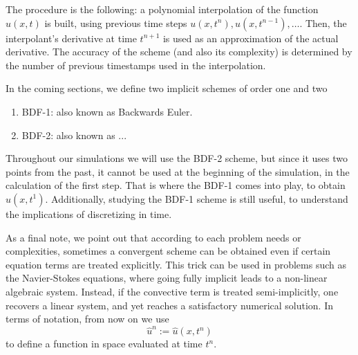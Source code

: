 \documentclass[../../main.tex]{subfiles}
\begin{document}
The procedure is the following: a polynomial interpolation of the function $u(x,t)$ is built, 
using previous time steps $u(x,t^{n}), u(x,t^{n-1}), \ldots$.
Then, the interpolant's derivative at time $t^{n+1}$ is used as an approximation of the actual derivative.
The accuracy of the scheme (and also its complexity) is determined by the number of previous timestamps used in the interpolation. 

In the coming sections, we define two implicit schemes of order one and two
\begin{enumerate}
    \item BDF-1: also known as Backwards Euler.
    \item BDF-2: also known as ... 
\end{enumerate}
Throughout our simulations we will use the BDF-2 scheme, but since it uses two points from the past, 
it cannot be used at the beginning of the simulation, in the calculation of the first step. 
That is where the BDF-1 comes into play, to obtain $u(x,t^1)$.
Additionally, studying the BDF-1 scheme is still useful, to understand the implications of discretizing in time.  

As a final note, we point out that according to each problem needs or complexities, sometimes a convergent scheme can be obtained even if certain equation terms are treated explicitly.
This trick can be used in problems such as the Navier-Stokes equations, where going fully implicit leads to a non-linear algebraic system. 
Instead, if the convective term is treated semi-implicitly, one recovers a linear system, and yet reaches a satisfactory numerical solution.
In terms of notation, from now on we use
\begin{equation}
    \hat{u}^n := \hat{u}(x,t^n)
\end{equation}
to define a function in space evaluated at time $t^n$.
\end{document}
